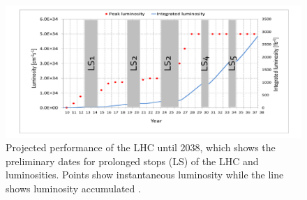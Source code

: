 \documentclass[final,3p]{CSP}
\begin{document}
  \begin{figure}[H]
    \centering
    \includegraphics[width=0.9\columnwidth]{./lum6.png}
    \caption{Projected performance of the LHC until 2038, which shows the preliminary dates for prolonged stops (LS) of the LHC and luminosities. Points show instantaneous luminosity while the line shows luminosity accumulated \cite{collaborations2019report}.}
    \label{figure6}
  \end{figure}
  \clearpage


\end{document}
